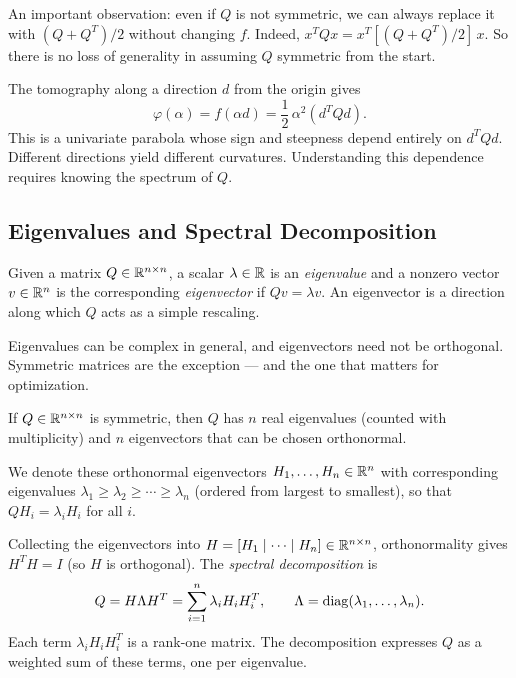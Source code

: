An important observation: even if $Q$ is not symmetric, we can always replace it with $(Q + Q^T)/2$ without changing $f$.
Indeed, $x^T Q x = x^T [(Q + Q^T)/2]\, x$.
So there is no loss of generality in assuming $Q$ symmetric from the start.

The tomography along a direction $d$ from the origin gives
\begin{equation}\label{eq:tomography-quad}
	\varphi(\alpha) = f(\alpha d) = \frac{1}{2}\, \alpha^2 (d^T Q d).
\end{equation}
This is a univariate parabola whose sign and steepness depend entirely on $d^T Q d$.
Different directions yield different curvatures.
Understanding this dependence requires knowing the spectrum of $Q$.


\subsection{Eigenvalues and Spectral Decomposition}\label{ssec:spectral}

\begin{defn}\label{def:eigen}
	Given a matrix $Q \in \mathbb{R}^{n \times n}$, a scalar $\lambda \in \mathbb{R}$ is an \textit{eigenvalue} and a nonzero vector $v \in \mathbb{R}^n$ is the corresponding \textit{eigenvector} if $Qv = \lambda v$.
	An eigenvector is a direction along which $Q$ acts as a simple rescaling.
\end{defn}

Eigenvalues can be complex in general, and eigenvectors need not be orthogonal.
Symmetric matrices are the exception --- and the one that matters for optimization.

\begin{thm}\label{thm:sym-eigen}
	If $Q \in \mathbb{R}^{n \times n}$ is symmetric, then $Q$ has $n$ real eigenvalues (counted with multiplicity) and $n$ eigenvectors that can be chosen orthonormal.
\end{thm}

We denote these orthonormal eigenvectors $H_1, \dots, H_n \in \mathbb{R}^n$ with corresponding eigenvalues $\lambda_1 \geq \lambda_2 \geq \cdots \geq \lambda_n$ (ordered from largest to smallest), so that $Q H_i = \lambda_i H_i$ for all $i$.

\begin{defn}\label{def:spectral-decomp}
	Collecting the eigenvectors into $H = [H_1 \mid \cdots \mid H_n] \in \mathbb{R}^{n \times n}$, orthonormality gives $H^T H = I$ (so $H$ is orthogonal).
	The \textit{spectral decomposition} is
	\begin{equation}\label{eq:spectral-decomp}
		Q = H \Lambda H^T = \sum_{i=1}^{n} \lambda_i H_i H_i^T,
		\qquad \Lambda = \operatorname{diag}(\lambda_1, \dots, \lambda_n).
	\end{equation}
	Each term $\lambda_i H_i H_i^T$ is a rank-one matrix.
	The decomposition expresses $Q$ as a weighted sum of these terms, one per eigenvalue.
\end{defn}

